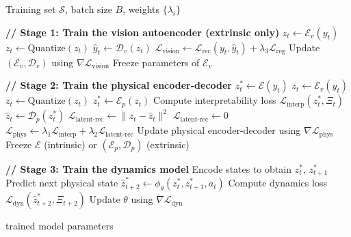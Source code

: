\documentclass[nonacm,sigconf]{acmart}
\begin{document}
\begin{algorithm}[t]
\caption{
Training pipeline for PIWM. Models are trained in separate stages, freezing the
parameters of earlier stages before optimizing the next one.
}
\label{alg:piwm}
\begin{algorithmic}[1]

\Require Training set $\mathcal{S}$, batch size $B$, weights $\{\lambda_i\}$

\State \textbf{// Stage 1: Train the vision autoencoder (extrinsic only)}
        \State $z_t \gets \mathcal{E}_v(y_t)$
            \State $z_t \gets \text{Quantize}(z_t)$
        \EndIf
        \State $\hat{y}_t \gets \mathcal{D}_v(z_t)$
        \State $\mathcal{L}_{\text{vision}} \gets 
               \mathcal{L}_{\text{rec}}(y_t, \hat{y}_t) 
               + \lambda_3 \mathcal{L}_{\text{reg}}$
        \State Update $(\mathcal{E}_v, \mathcal{D}_v)$ using 
               $\nabla \mathcal{L}_{\text{vision}}$
      \EndFor
    \EndFor
    \State Freeze parameters of $\mathcal{E}_v$
\EndIf

\State \textbf{// Stage 2: Train the physical encoder-decoder}
        \State $z^*_t \gets \mathcal{E}(y_t)$
    \Else
        \State $z_t \gets \mathcal{E}_v(y_t)$
            \State $z_t \gets \text{Quantize}(z_t)$
        \EndIf
        \State $z^*_t \gets \mathcal{E}_p(z_t)$
    \EndIf
    \State Compute interpretability loss 
           $\mathcal{L}_{\text{interp}}(z^*_t, \Xi_t)$
        \State $\hat{z}_t \gets \mathcal{D}_p(z^*_t)$
        \State $\mathcal{L}_{\text{latent-rec}} \gets 
               \|z_t - \hat{z}_t\|^2$
    \Else
        \State $\mathcal{L}_{\text{latent-rec}} \gets 0$
    \EndIf
    \State $\mathcal{L}_{\text{phys}} \gets 
           \lambda_1 \mathcal{L}_{\text{interp}}
           + \lambda_2 \mathcal{L}_{\text{latent-rec}}$
\State Update physical encoder-decoder using $\nabla \mathcal{L}_{\text{phys}}$
\EndFor
\EndFor
\State Freeze $\mathcal{E}$ (intrinsic) or $(\mathcal{E}_p, \mathcal{D}_p)$ (extrinsic)

\State \textbf{// Stage 3: Train the dynamics model}
    \State Encode states to obtain $z^*_t$, $z^*_{t+1}$
    \State Predict next physical state 
           $\hat{z}^*_{t+2} \gets \phi_\theta(z^*_t, z^*_{t+1}, a_t)$
    \State Compute dynamics loss 
           $\mathcal{L}_{\text{dyn}}(\hat{z}^*_{t+2}, \Xi_{t+2})$
    \State Update $\theta$ using $\nabla \mathcal{L}_{\text{dyn}}$
  \EndFor
\EndFor

\State \Return trained model parameters
\end{algorithmic}
\end{algorithm}
\end{document}
